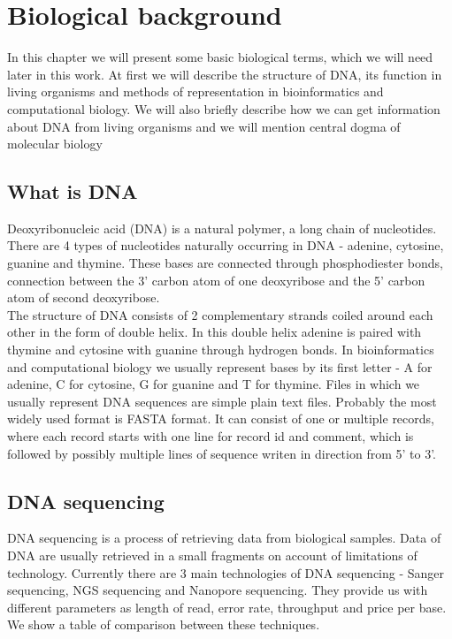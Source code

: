 \chapter{Biological background}
In this chapter we will present some basic biological terms, which we will need later in this work.
At first we will describe the structure of DNA, its function in living organisms
and methods of representation in bioinformatics and computational biology.
We will also briefly describe how we can get information about DNA from living organisms and we will mention central dogma of molecular biology

\section{What is DNA}
Deoxyribonucleic acid (DNA) is a natural polymer, a long chain of nucleotides. There are 4 types of nucleotides
naturally occurring in DNA - adenine, cytosine, guanine and thymine. These bases are connected through phosphodiester bonds,
connection between the 3' carbon atom of one deoxyribose and the 5' carbon atom of second deoxyribose. \\
The structure of DNA consists of 2 complementary strands coiled around each other in the form of double helix.
In this double helix adenine is paired with thymine and cytosine with guanine through hydrogen bonds.
In bioinformatics and computational biology we usually represent bases by its first letter - A for adenine, C for cytosine, G for guanine and T for thymine.
Files in which we usually represent DNA sequences are simple plain text files. Probably the most widely used format is FASTA format.
It can consist of one or multiple records, where each record starts with one line for record id and comment, which is followed by possibly multiple lines of sequence writen in direction from 5' to 3'.

\section{DNA sequencing}
DNA sequencing is a process of retrieving data from biological samples.
Data of DNA are usually retrieved in a small fragments on account of limitations of technology.
Currently there are 3 main technologies of DNA sequencing - Sanger sequencing, NGS sequencing and Nanopore sequencing.
They provide us with different parameters as length of read, error rate, throughput and price per base.
We show a table of comparison between these techniques.


